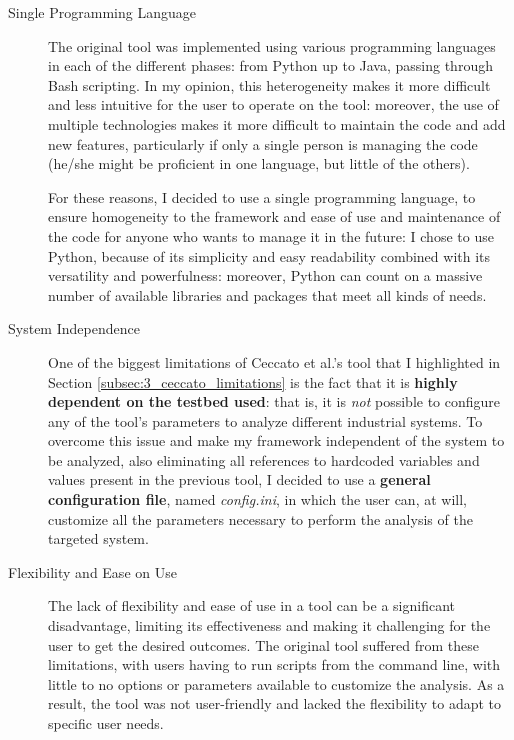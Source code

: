 \begin{description}
	\item[Single Programming Language] The original tool was implemented using various programming languages in each of the different phases: from Python up to Java, passing through Bash scripting. \newline
	In my opinion, this heterogeneity makes it more difficult and less intuitive for the user to operate on the tool: moreover, the use of multiple technologies makes it more difficult to maintain the code and add new features, particularly if only a single person is managing the code (he/she might be proficient in one language, but little of the others).
	
	\bigskip
	For these reasons, I decided to use a single programming language, to ensure homogeneity to the framework and ease of use and maintenance of the code for anyone who wants to manage it in the future: I chose to use Python, because of its simplicity and easy readability combined with its versatility and powerfulness: moreover, Python can count on a massive number of available libraries and packages that meet all kinds of needs.
	
	\item[System Independence] One of the biggest limitations of Ceccato et al.'s tool that I highlighted in Section \ref{subsec:3_ceccato_limitations} is the fact that it is \textbf{highly dependent on the testbed used}: that is, it is \textit{not} possible to configure any of the tool's parameters to analyze different industrial systems.\newline
	To overcome this issue and make my framework independent of the system to be analyzed, also eliminating all references to hardcoded variables and values present in the previous tool, I decided to use a \textbf{general configuration file}, named \textit{config.ini}, in which the user can, at will, customize all the parameters necessary to perform the analysis of the targeted system.
	
	\item[Flexibility and Ease on Use] The lack of flexibility and ease of use in a tool can be a significant disadvantage, limiting its effectiveness and making it challenging for the user to get the desired outcomes. The original tool suffered from these limitations, with users having to run scripts from the command line, with little to no options or parameters available to customize the analysis. As a result, the tool was not user-friendly and lacked the flexibility to adapt to specific user needs. 
	

\end{description}
